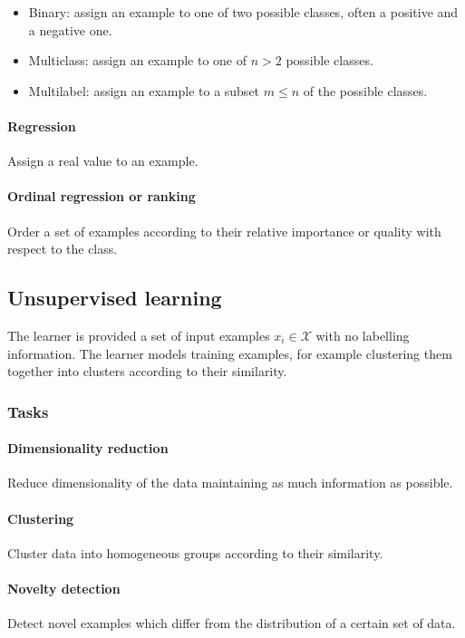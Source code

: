 			\begin{multicols}{2}
				\begin{itemize}
					\item Binary: assign an example to one of two possible classes, often a positive and a negative one.
					\item Multiclass: assign an example to one of $n>2$ possible classes.
					\item Multilabel: assign an example to a subset $m\le n$ of the possible classes.
				\end{itemize}
			\end{multicols}

			\paragraph{Regression}
			Assign a real value to an example.

			\paragraph{Ordinal regression or ranking}
			Order a set of examples according to their relative importance or quality with respect to the class.


	\subsection{Unsupervised learning}
	The learner is provided a set of input examples $x_i\in \mathcal{X}$ with no labelling information.
	The learner models training examples, for example clustering them together into clusters according to their similarity.

		\subsubsection{Tasks}

			\paragraph{Dimensionality reduction}
			Reduce dimensionality of the data maintaining as much information as possible.

			\paragraph{Clustering}
			Cluster data into homogeneous groups according to their similarity.

			\paragraph{Novelty detection}
			Detect novel examples which differ from the distribution of a certain set of data.


